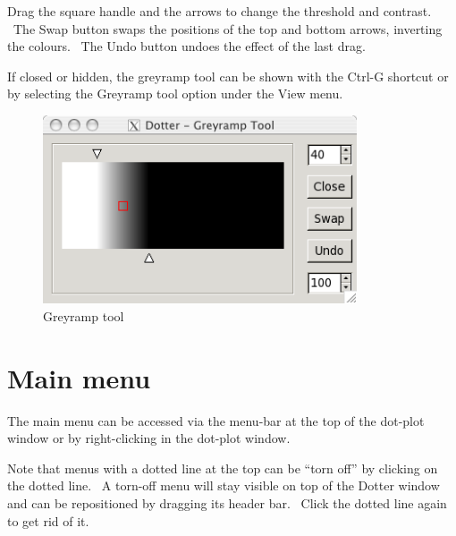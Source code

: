 \documentclass[letterpaper]{article}
\begin{document}
\bigskip

{Drag the square handle and the arrows to change the threshold and
contrast. \ The {\textquotesingle}Swap{\textquotesingle} button swaps
the positions of the top and bottom arrows, inverting the colours.
\ The {\textquotesingle}Undo{\textquotesingle} button undoes the effect
of the last drag.}

\bigskip

{If closed or hidden, the greyramp tool can be shown with the
{\textquotesingle}Ctrl-G{\textquotesingle} shortcut or by selecting the
{\textquotesingle}Greyramp tool{\textquotesingle} option under the
{\textquotesingle}View{\textquotesingle} menu.}

\begin{figure}
 \centering
 \color[rgb]{0.30980393,0.5058824,0.7411765}
 \includegraphics[width=9.287cm,height=5.567cm]{img_window_greyramp.png}
 \caption{Greyramp tool}
\end{figure}

\bigskip

{\color[rgb]{0.0,0.27058825,0.5254902}\section[Main menu]{Main menu}}
{The main menu can be accessed via the menu-bar at the top of the
dot-plot window or by right-clicking in the dot-plot window.}

\bigskip

{Note that menus with a dotted line at the top can be
{\textquotedblleft}torn off{\textquotedblright} by clicking on the
dotted line. \ A torn-off menu will stay visible on top of the Dotter
window and can be repositioned by dragging its header bar. \ Click the
dotted line again to get rid of it. }
\end{document}
